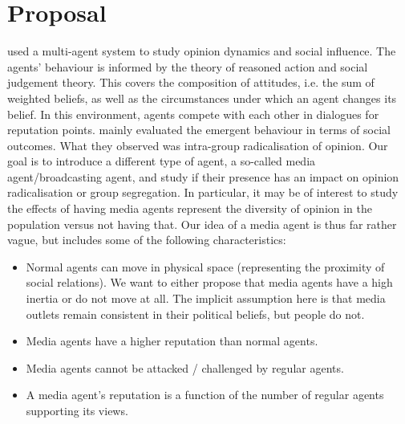 \section{Proposal}
\cite{dykstra2013} used a multi-agent system to study opinion dynamics and social influence. The agents' behaviour is informed by the theory of reasoned action and social judgement theory. This covers the composition of attitudes, i.e. the sum of weighted beliefs, as well as the circumstances under which an agent changes its belief. In this environment, agents compete with each other in dialogues for reputation points. \cite{dykstra2013} mainly evaluated the emergent behaviour in terms of social outcomes. What they observed was intra-group radicalisation of opinion. Our goal is to introduce a different type of agent, a so-called media agent/broadcasting agent, and study if their presence has an impact on opinion radicalisation or group segregation. In particular, it may be of interest to study the effects of having media agents represent the diversity of opinion in the population versus not having that. Our idea of a media agent is thus far rather vague, but includes some of the following characteristics:
\begin{itemize}
  \item Normal agents can move in physical space (representing the proximity of social relations). We want to either propose that media agents have a high inertia or do not move at all. The implicit assumption here is that media outlets remain consistent in their political beliefs, but people do not.
  \item Media agents have a higher reputation than normal agents. 
  \item Media agents cannot be attacked / challenged by regular agents.
  \item A media agent's reputation is a function of the number of regular agents supporting its views.
\end{itemize}




